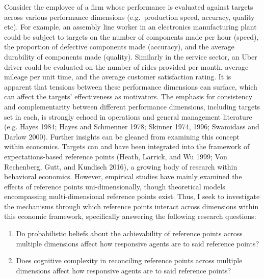 \documentclass[
  12,
  letterpaper,
  DIV=11,
  numbers=noendperiod]{scrartcl}
\providecommand{\tightlist}{%
  \setlength{\itemsep}{0pt}\setlength{\parskip}{0pt}}\usepackage{longtable,booktabs,array}
\begin{document}
Consider the employee of a firm whose performance is evaluated against
targets across various performance dimensions (e.g.~production speed,
accuracy, quality etc). For example, an assembly line worker in an
electronics manufacturing plant could be subject to targets on the
number of components made per hour (speed), the proportion of defective
components made (accuracy), and the average durability of components
made (quality). Similarly in the service sector, an Uber driver could be
evaluated on the number of rides provided per month, average mileage per
unit time, and the average customer satisfaction rating. It is apparent
that tensions between these performance dimensions can surface, which
can affect the targets' effectiveness as motivators. The emphasis for
consistency and complementarity between different performance
dimensions, including targets set in each, is strongly echoed in
operations and general management literature (e.g. Hayes 1984; Hayes and
Schmenner 1978; Skinner 1974, 1996; Swamidass and Darlow 2000). Further
insights can be gleaned from examining this concept within economics.
Targets can and have been integrated into the framework of
expectations-based reference points (Heath, Larrick, and Wu 1999; Von
Rechenberg, Gutt, and Kundisch 2016), a growing body of research within
behavioral economics. However, empirical studies have mainly examined
the effects of reference points uni-dimensionally, though theoretical
models encompassing multi-dimensional reference points exist. Thus, I
seek to investigate the mechanisms through which reference points
interact across dimensions within this economic framework, specifically
answering the following research questions:

\begin{enumerate}
\def\labelenumi{\arabic{enumi}.}
\tightlist
\item
  Do probabilistic beliefs about the achievability of reference points
  across multiple dimensions affect how responsive agents are to said
  reference points?
\item
  Does cognitive complexity in reconciling reference points across
  multiple dimensions affect how responsive agents are to said reference
  points?
\end{enumerate}
\end{document}

